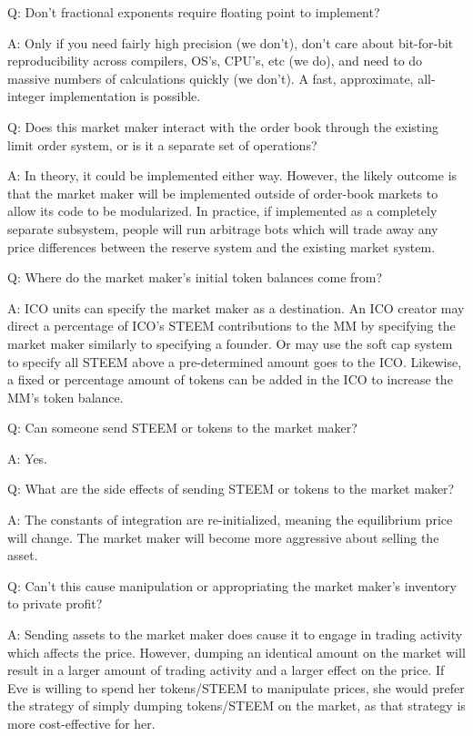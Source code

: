 \documentclass{article}
\begin{document}
Q:  Don't fractional exponents require floating point to implement?

A:  Only if you need fairly high precision (we don't), don't care about bit-for-bit
reproducibility across compilers, OS's, CPU's, etc (we do), and need to do massive
numbers of calculations quickly (we don't).  A fast, approximate, all-integer
implementation is possible.

Q:  Does this market maker interact with the order book through the existing limit order
system, or is it a separate set of operations?

A:  In theory, it could be implemented either way.  However, the likely outcome is that the market maker will be implemented outside of order-book markets to allow its code to be modularized.  In practice, if implemented as a completely separate subsystem, people will run arbitrage bots which will trade away any price differences
between the reserve system and the existing market system.

Q:  Where do the market maker's initial token balances come from?

A:  ICO units can specify the market maker as a destination.  An ICO creator
may direct a percentage of ICO's STEEM contributions to the MM by specifying
the market maker similarly to specifying a founder.  Or may use the soft cap
system to specify all STEEM above a pre-determined amount goes to the ICO.  Likewise,
a fixed or percentage amount of tokens can be added in the ICO to increase the MM's
token balance.

Q:  Can someone send STEEM or tokens to the market maker?

A:  Yes.

Q:  What are the side effects of sending STEEM or tokens to the market maker?

A:  The constants of integration are re-initialized, meaning the equilibrium price will
change.  The market maker will become more aggressive about selling the asset.

Q:  Can't this cause manipulation or appropriating the market maker's inventory
to private profit?

A:  Sending assets to the market maker does cause it to engage in trading activity
which affects the price.  However, dumping an identical amount on the market will
result in a larger amount of trading activity and a larger effect on the price.  If
Eve is willing to spend her tokens/STEEM to manipulate prices, she would prefer
the strategy of simply dumping tokens/STEEM on the market, as that strategy is more
cost-effective for her.
\end{document}
